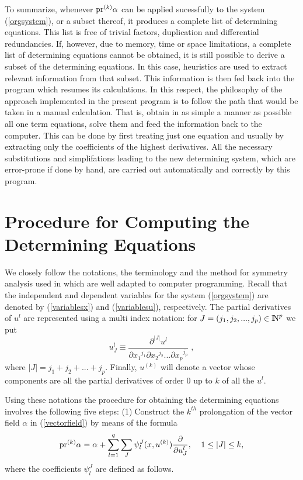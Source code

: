 {\pagebreak
To summarize, whenever $ {\rm pr}^{(k)} \alpha $  
can be applied sucessfully to the system (\ref{orgsystem}), 
or a subset thereof, it produces a complete list of
determining equations.  
This list is free of trivial factors, duplication and differential 
redundancies. 
If, however, due to memory, time or space limitations, a complete list of
determining equations cannot be obtained, it is still possible to
derive a subset of the determining equations.  In this case,
heuristics are used to extract relevant information from that
subset.  This information is then fed back
into the program which resumes its calculations.
\nopagebreak
\vskip 1pt
In this respect, 
the philosophy of the approach implemented in the present program is to 
follow the path that would be taken in a manual calculation. That is, 
obtain in as simple a manner as possible all one term equations, solve
them and feed the information back to the computer. This can be done by first
treating just one equation and usually by extracting only the coefficients
of the highest derivatives. All the necessary substitutions and simplifations 
leading to the new determining system, 
which are error-prone if done by hand, are carried out automatically 
and correctly by this program.

\nopagebreak
\section{Procedure for Computing the Determining Equations}
We closely follow the notations, the terminology and the method for symmetry 
analysis used in \cite{olverbook}
which are well adapted to computer programming. 
Recall that the independent and 
dependent variables for the system (\ref{orgsystem}) are denoted by 
(\ref{variablesx}) and (\ref{variablesu}), respectively. 
The partial derivatives of $u^l$ are represented using a
multi index notation: for $J = (j_1 , j_2 , ... , j_p ) \in {{\rm I\kern-.20em N}}^p $
we put
\begin{equation}
u_{J}^{l} \equiv \frac{\partial^{|J|} u^l}
{\partial {x_1}^{j_1}   \partial {x_2}^{j_2} ...  \partial {x_p}^{j_p}} \; ,
\label{ujl}
\end{equation}
where $|J| = j_1 + j_2 + ... + j_p$.
Finally, $u^{(k)}$ will denote a vector whose components are all the partial
derivatives of order $0$ up to $k$ of all the $u^l$.

\nopagebreak
Using these notations the procedure for obtaining the determining equations
involves the following five steps:
\nopagebreak
\vskip 1pt
\noindent
(1)$\;$Construct the $k^{th}$ prolongation of the vector field $\alpha$ 
in (\ref{vectorfield}) by means of the formula
\begin{equation}
{\rm pr}^{(k)} \alpha = \alpha 
+ \sum_{l=1}^{q} \sum_{J} \psi_{l}^{J} (x, u^{(k)})
\frac{\partial }{\partial u^{l}_{J} }, \;\;\;\; 1 \leq |J| \leq k,
\label{prolongationonalpha}
\end{equation}
where the coefficients $ \psi^{J}_{l} $ are defined as follows. 

}
